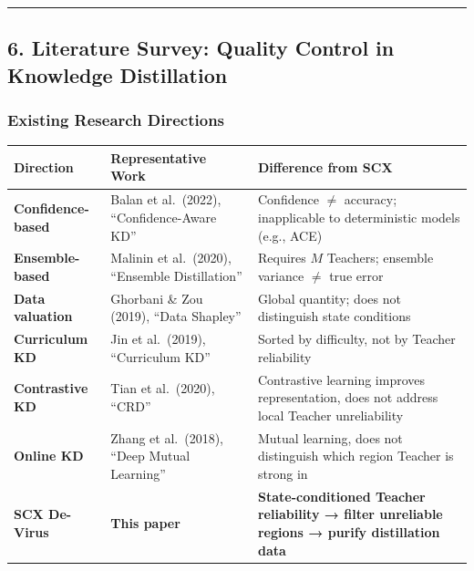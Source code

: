 \documentclass[
  12pt,
]{article}
\begin{document}
\begin{center}\rule{0.5\linewidth}{0.5pt}\end{center}

\subsection{6. Literature Survey: Quality Control in Knowledge Distillation}\label{literature-survey}

\subsubsection{Existing Research Directions}\label{existing-research-directions}

\begin{longtable}[]{@{}
  >{\raggedright\arraybackslash}p{}
  >{\raggedright\arraybackslash}p{}
  >{\raggedright\arraybackslash}p{}@{}}
\toprule\noalign{}
\begin{minipage}[b]{\linewidth}\raggedright
Direction
\end{minipage} & \begin{minipage}[b]{\linewidth}\raggedright
Representative Work
\end{minipage} & \begin{minipage}[b]{\linewidth}\raggedright
Difference from SCX
\end{minipage} \\
\midrule\noalign{}
\endhead
\bottomrule\noalign{}
\endlastfoot
\textbf{Confidence-based} & Balan et al.~(2022), ``Confidence-Aware KD'' & Confidence $\neq$ accuracy; inapplicable to deterministic models (e.g., ACE) \\
\textbf{Ensemble-based} & Malinin et al.~(2020), ``Ensemble Distillation'' & Requires $M$ Teachers; ensemble variance $\neq$ true error \\
\textbf{Data valuation} & Ghorbani \& Zou (2019), ``Data Shapley'' & Global quantity; does not distinguish state conditions \\
\textbf{Curriculum KD} & Jin et al.~(2019), ``Curriculum KD'' & Sorted by difficulty, not by Teacher reliability \\
\textbf{Contrastive KD} & Tian et al.~(2020), ``CRD'' & Contrastive learning improves representation, does not address local Teacher unreliability \\
\textbf{Online KD} & Zhang et al.~(2018), ``Deep Mutual Learning'' & Mutual learning, does not distinguish which region Teacher is strong in \\
\textbf{SCX De-Virus} & \textbf{This paper} & \textbf{State-conditioned Teacher reliability → filter unreliable regions → purify distillation data} \\
\end{longtable}
\end{document}
